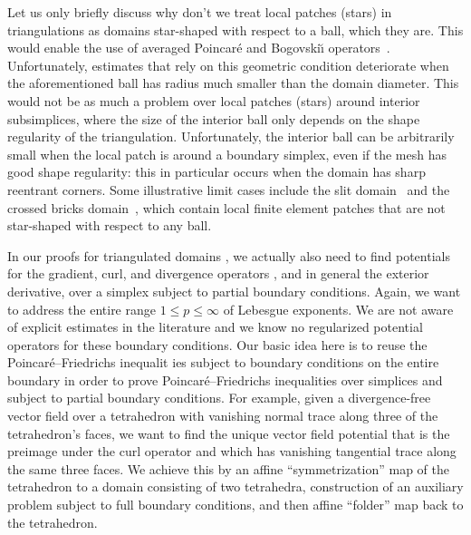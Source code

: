 \documentclass[10pt,a4paper]{article}
\newcommand\cye[1]{%
\protect\leavevmode
\begingroup
    \color{blue}%
    #1%
\endgroup
}
\begin{document}

\cye{Let us only briefly discuss why don't we treat local \cye{patches} (stars) in triangulations as} domains star-shaped with respect to a ball, which they are. This \cye{would enable} the use of averaged Poincar\'e and Bogovski\u{\i} operators~\cite{costabel2010bogovskiui}. Unfortunately, estimates that rely on this geometric condition deteriorate when the aforementioned ball has radius much smaller than the domain diameter. 
This \cye{would not be} as much a problem over local patches (stars) around interior subsimplices, where the size of the interior ball only depends on the shape regularity of the triangulation. 
\cye{Unfortunately,} the interior ball can be arbitrarily small when the local patch is around a boundary simplex, even if the mesh has good shape regularity: 
this \cye{in particular} occurs when the domain has sharp reentrant corners. Some illustrative limit cases include the slit domain~\cite{veeser2012poincare} and the crossed bricks domain~\cite{licht2019smoothed}, 
which contain local finite element patches \cye{that} are not star-shaped with respect to any ball. 


\cye{In our proofs for triangulated domains}, we \cye{actually also} need to find potentials for the gradient, curl, and divergence operators\cye{, and in general the exterior derivative,} over a simplex subject to partial boundary conditions. 
Again, we want to address the entire range $1 \leq p \leq \infty$ of Lebesgue exponents. 
We are not aware of explicit estimates in the literature and \cye{we know} no regularized potential operators for these boundary conditions. 
\cye{Our basic idea here is to reuse} the Poincar\'e--Friedrichs inequalit\cye{ies} subject to boundary conditions \cye{on the entire boundary in order} to prove Poincar\'e--Friedrichs inequalities over simplices and subject to partial boundary conditions. 
For example, given a divergence-free vector field over a tetrahedron with vanishing normal trace along three of the tetrahedron's faces, we want to find the unique vector field potential that is the preimage under the curl operator and which has vanishing tangential trace along the same three faces. We achieve this by \cye{an affine ``symmetrization'' map of the tetrahedron to a domain consisting of two tetrahedra,} construction of an auxiliary problem subject to full boundary conditions, and then affine ``folder'' map back to the tetrahedron.
\end{document}
